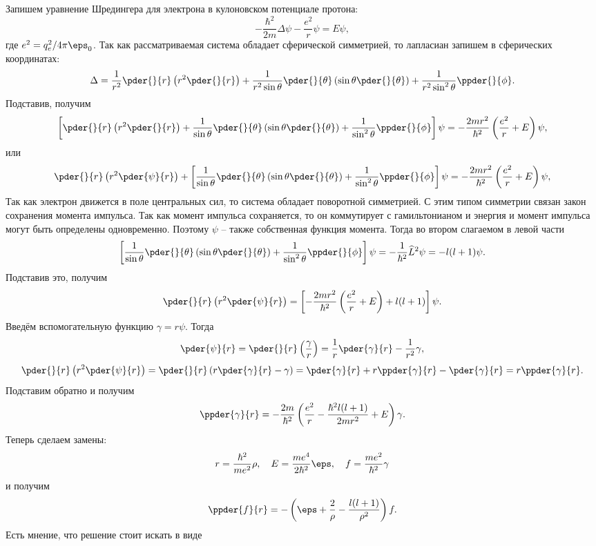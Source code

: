 \documentclass{minimal}
\begin{document}
Запишем уравнение Шредингера для электрона в кулоновском потенциале протона:
\[
    -\frac{\hbar^2}{2m}\Delta\psi - \frac{e^2}{r}\psi = E\psi,
\]
где \( e^2 = q_e^2/4\pi\eps_0 \). Так как рассматриваемая система обладает
сферической симметрией, то лапласиан запишем в сферических координатах:
\[
    \Delta = \frac{1}{r^2}\pder{}{r}\left(r^2\pder{}{r}\right) +
    \frac{1}{r^2\sin\theta}\pder{}{\theta}\left(\sin\theta\pder{}{\theta}\right) +
    \frac{1}{r^2\sin^2\theta}\ppder{}{\phi}.
\]
Подставив, получим
\[
    \left[\pder{}{r}\left(r^2\pder{}{r}\right) +
    \frac{1}{\sin\theta}\pder{}{\theta}\left(\sin\theta\pder{}{\theta}\right) +
    \frac{1}{\sin^2\theta}\ppder{}{\phi}\right]\psi =
    -\frac{2mr^2}{\hbar^2}\left(\frac{e^2}{r}+E\right)\psi,
\]
или
\[
    \pder{}{r}\left(r^2\pder{\psi}{r}\right) +
    \left[
    \frac{1}{\sin\theta}\pder{}{\theta}\left(\sin\theta\pder{}{\theta}\right) +
    \frac{1}{\sin^2\theta}\ppder{}{\phi}\right]\psi =
    -\frac{2mr^2}{\hbar^2}\left(\frac{e^2}{r}+E\right)\psi,
\]
Так как электрон движется в поле центральных сил, то система обладает
поворотной симметрией. С этим типом симметрии связан закон сохранения момента
импульса. Так как момент импульса сохраняется, то он коммутирует
с гамильтонианом и энергия и момент импульса могут быть определены
одновременно. Поэтому \( \psi \) -- также собственная функция момента.
Тогда во втором слагаемом в левой части
\[
    \left[
    \frac{1}{\sin\theta}\pder{}{\theta}\left(\sin\theta\pder{}{\theta}\right) +
    \frac{1}{\sin^2\theta}\ppder{}{\phi}\right]\psi =
    -\frac{1}{\hbar^2}\hat{L}^2\psi = -l(l+1)\psi.
\]
Подставив это, получим
\[
    \pder{}{r}\left(r^2\pder{\psi}{r}\right) =
    \left[-\frac{2mr^2}{\hbar^2}\left(\frac{e^2}{r}+E\right)+l(l+1)\right]\psi.
\]
Введём вспомогательную функцию \( \gamma = r\psi \). Тогда
\[
    \pder{\psi}{r} = \pder{}{r}\left(\frac{\gamma}{r}\right) =
    \frac{1}{r}\pder{\gamma}{r} - \frac{1}{r^2}\gamma,
\]
\[
    \pder{}{r}\left(r^2\pder{\psi}{r}\right) = \pder{}{r}\left(
    r\pder{\gamma}{r} - \gamma\right) = \pder{\gamma}{r} + r\ppder{\gamma}{r} -
    \pder{\gamma}{r} = r\ppder{\gamma}{r}.
\]
Подставим обратно и получим
\[
    \ppder{\gamma}{r} =
    -\frac{2m}{\hbar^2}
    \left(\frac{e^2}{r} - \frac{\hbar^2l(l+1)}{2mr^2} + E\right)\gamma.
\]
Теперь сделаем замены:
\[
    r = \frac{\hbar^2}{me^2}\rho,\quad E = \frac{me^4}{2\hbar^2}\eps,\quad
    f = \frac{me^2}{\hbar^2}\gamma
\]
и получим
\[
    \ppder{f}{r} = - \left(\eps + \frac{2}{\rho} -
    \frac{l(l+1)}{\rho^2}\right)f.
\]
Есть мнение, что решение стоит искать в виде
\end{document}
